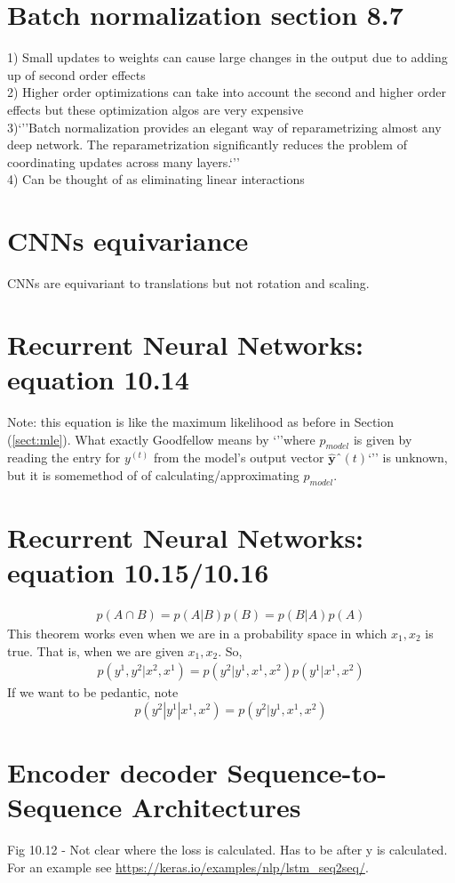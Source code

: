 \documentclass{article}
\newcommand{\beq}{\begin{equation}}
\newcommand{\eeq}{\end{equation}}
\newcommand{\ber}{\begin{eqnarray}}
\newcommand{\eer}{\end{eqnarray}}
\begin{document}
%
%
%
\section{Batch normalization section 8.7}
1) Small updates to weights can cause large changes in the output due to adding up of second order effects\\
2) Higher order optimizations can take into account the second and higher order effects but these optimization algos are very expensive\\
3)`''Batch normalization provides an elegant way of reparametrizing almost any deep
network. The reparametrization significantly reduces the problem of coordinating
updates across many layers.`''\\
4) Can be thought of as eliminating linear interactions
%
%
%
\section{CNNs equivariance}
CNNs are equivariant to translations but not rotation and scaling.
%
%
%
\section{Recurrent Neural Networks: equation 10.14}
Note: this equation is like the maximum likelihood as before in Section (\ref{sect:mle}). What exactly Goodfellow means by `''where $p_{model}$ is given by reading the entry for $y^{(t)}$ from the
model’s output vector $\hat{\pmb{y}}ˆ{(t)}$`'' is unknown, but it is somemethod of of calculating/approximating $p_{model}$.
%
%
%
\section{Recurrent Neural Networks: equation 10.15/10.16}
\ber
p(A\cap{B}) = p(A|B)p(B) = p(B|A)p(A)
\eer
This theorem works even when we are in a probability space in which $x_1,x_2$ is true. That is, when we are given $x_1,x_2$. So,
\ber
p(y^1,y^2|x^2,x^1) = p(y^2|y^1,x^1,x^2)p(y^1|x^1,x^2)
\eer
If we want to be pedantic, note
\beq
p(y^2|y^1|x^1,x^2) = p(y^2|y^1,x^1,x^2)
\eeq
%
%
%
\section{Encoder decoder Sequence-to-Sequence Architectures}
Fig 10.12 - Not clear where the loss is calculated. Has to be after y is calculated. For an example see \url{https://keras.io/examples/nlp/lstm_seq2seq/}.
%
%
%
\end{document}
